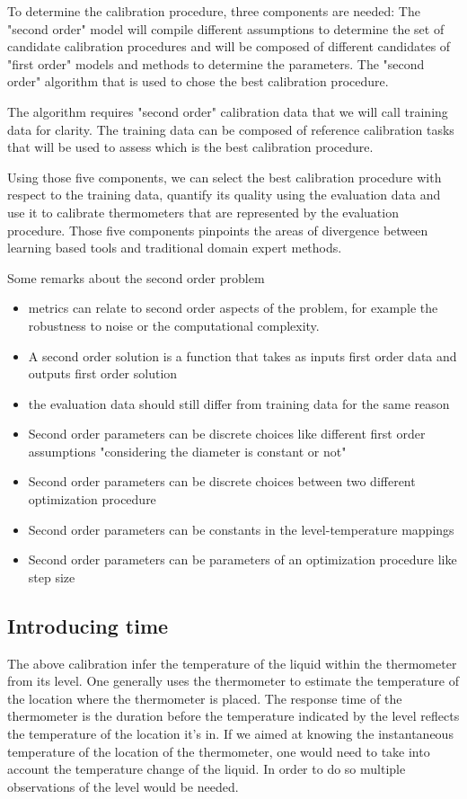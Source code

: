 \begin{bibunit}
To determine the calibration procedure, three components are needed:
The "second order" model will compile different assumptions to determine the set of candidate calibration procedures and will be composed of different candidates of "first order" models and methods to determine the parameters.
The "second order" algorithm that is used to chose the best calibration procedure. 

The algorithm requires "second order" calibration data that we will call training data for clarity. The training data can be composed of reference calibration tasks that will be used to assess which is the best calibration procedure.


Using those five components, we can select the best calibration procedure with respect to the training data, quantify its quality using the evaluation data and use it to calibrate thermometers that are represented by the evaluation procedure.
Those five components pinpoints the areas of divergence between learning based tools and traditional domain expert methods.



Some remarks about the second order problem
\begin{itemize}
\item metrics can relate to second order aspects of the problem, for example the robustness to noise or the computational complexity.
\item A second order solution is a function that takes as inputs first order data and outputs first order solution
\item the evaluation data should still differ from training data for the same reason
\item Second order parameters can be discrete choices like different first order assumptions "considering the diameter is constant or not"
\item Second order parameters can be discrete choices between two different optimization procedure
\item Second order parameters can be constants in the level-temperature mappings
\item Second order parameters can be parameters of an optimization procedure like step size
\end{itemize}

\subsection{Introducing time}
The above calibration infer the temperature of the liquid within the thermometer from its level. One generally uses the thermometer to estimate the temperature of the location where the thermometer is placed.
The response time of the thermometer is the duration before the temperature indicated by the level reflects the temperature of the location it's in. 
If we aimed at knowing the instantaneous temperature of the location of the thermometer, one would need to take into account the temperature change of the liquid. In order to do so multiple observations of the level would be needed.


\end{bibunit}
